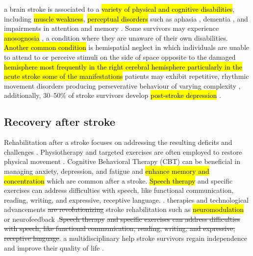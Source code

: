  a brain stroke is associated to a \hl{variety of physical and cognitive disabilities}, including \hl{muscle weakness}, \hl{perceptual disorders} such as aphasia \cite{hamilton_mechanisms_2011}, dementia \cite{leys_poststroke_2005}, and impairments in attention and memory \cite{lim_stroke_2009}. Some survivors may experience \hl{anosognosia} \cite{noauthor_anosognosia_nodate}, a condition where they are unaware of their own disabilities. \hl{Another common condition} is hemispatial neglect in which individuals are unable to attend to or perceive stimuli on the side of space opposite to the damaged \hl{hemisphere most frequently in the right cerebral hemisphere particularly in the acute stroke some of the manifestations} patients may exhibit repetitive, rhythmic movement disorders producing  perseverative behaviour of varying complexity \cite{ltd_spatial_2015}, additionally, 30–50\% of stroke survivors develop \hl{post-stroke depression} \cite{villain_facteurs_nodate}.

\subsection {Recovery after stroke} 
Rehabilitation after a stroke focuses on addressing the resulting deficits and challenges  \cite{licht_stroke_1975}. Physiotherapy and targeted exercises are often employed to restore physical movement . Cognitive Behavioral Therapy (CBT) can be beneficial in managing anxiety, depression, and fatigue \cite{cumming_prevalence_2016} and \hl{enhance memory and concentration} which are common after a stroke. \hl{Speech therapy} \cite{noauthor_speech_nodate} and specific exercises can address difficulties with speech, like functional communication, reading, writing, and expressive, receptive language. .  therapies and technological advancements  \st{are revolutionizing} stroke rehabilitation such as \hl{neuromodulation} \cite{saway_evolution_2024} or neurofeedback  \cite{wang_potential_2018}.\st{Speech therapy} \cite{noauthor_speech_nodate} \st{and specific exercises can address difficulties with speech, like functional communication, reading, writing, and expressive, receptive language}. 
  a multidisciplinary help stroke survivors regain independence and improve their quality of life \cite{langhorne_stroke_2011, benedetti_assessment_2022}.

